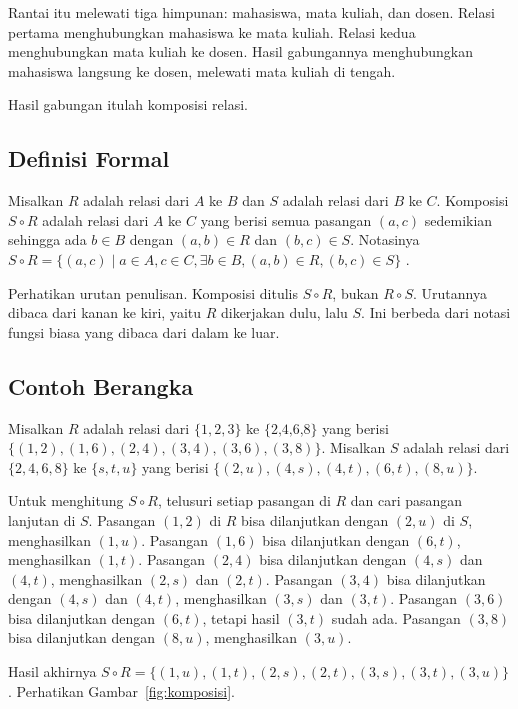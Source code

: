 \documentclass[11pt,a4paper]{article}
\begin{document}
Rantai itu melewati tiga himpunan: mahasiswa, mata kuliah, dan dosen. Relasi pertama menghubungkan mahasiswa ke mata kuliah. Relasi kedua menghubungkan mata kuliah ke dosen. Hasil gabungannya menghubungkan mahasiswa langsung ke dosen, melewati mata kuliah di tengah.

Hasil gabungan itulah komposisi relasi.

\subsection{Definisi Formal}

Misalkan $R$ adalah relasi dari $A$ ke $B$ dan $S$ adalah relasi dari $B$ ke $C$. Komposisi $S \circ R$ adalah relasi dari $A$ ke $C$ yang berisi semua pasangan $(a,c)$ sedemikian sehingga ada $b \in B$ dengan $(a,b) \in R$ dan $(b,c) \in S$. Notasinya $S \circ R=\{(a,c) \mid a \in A, c \in C, \exists b \in B, (a,b) \in R, (b,c) \in S\}$ \cite{rosen}.

Perhatikan urutan penulisan. Komposisi ditulis $S \circ R$, bukan $R \circ S$. Urutannya dibaca dari kanan ke kiri, yaitu $R$ dikerjakan dulu, lalu $S$. Ini berbeda dari notasi fungsi biasa yang dibaca dari dalam ke luar.

\subsection{Contoh Berangka}

Misalkan $R$ adalah relasi dari $\{1,2,3\}$ ke $\{\text{2,4,6,8}\}$ yang berisi $\{(1,2),(1,6),(2,4),(3,4),(3,6),(3,8)\}$. Misalkan $S$ adalah relasi dari $\{2,4,6,8\}$ ke $\{s,t,u\}$ yang berisi $\{(2,u),(4,s),(4,t),(6,t),(8,u)\}$.

Untuk menghitung $S \circ R$, telusuri setiap pasangan di $R$ dan cari pasangan lanjutan di $S$. Pasangan $(1,2)$ di $R$ bisa dilanjutkan dengan $(2,u)$ di $S$, menghasilkan $(1,u)$. Pasangan $(1,6)$ bisa dilanjutkan dengan $(6,t)$, menghasilkan $(1,t)$. Pasangan $(2,4)$ bisa dilanjutkan dengan $(4,s)$ dan $(4,t)$, menghasilkan $(2,s)$ dan $(2,t)$. Pasangan $(3,4)$ bisa dilanjutkan dengan $(4,s)$ dan $(4,t)$, menghasilkan $(3,s)$ dan $(3,t)$. Pasangan $(3,6)$ bisa dilanjutkan dengan $(6,t)$, tetapi hasil $(3,t)$ sudah ada. Pasangan $(3,8)$ bisa dilanjutkan dengan $(8,u)$, menghasilkan $(3,u)$.

Hasil akhirnya $S \circ R=\{(1,u),(1,t),(2,s),(2,t),(3,s),(3,t),(3,u)\}$. Perhatikan Gambar~\ref{fig:komposisi}.
\end{document}
